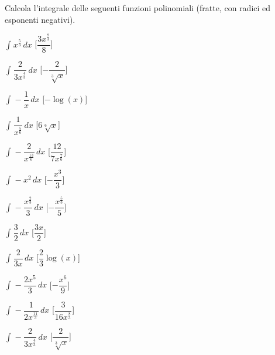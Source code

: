\begin{esercizio}\label{ese: 2}
Calcola l'integrale delle seguenti funzioni polinomiali                  
       (fratte, con radici ed esponenti negativi).
\begin{multicols}{2}
 \begin{enumeratea}
\item \(\int_{}^{}x^{\frac{5}{3}}\, dx\) 
 \hfill [\(\dfrac{3 x^{\frac{8}{3}}}{8}\)]
\item \(\int_{}^{}\dfrac{2}{3 x^{\frac{4}{3}}}\, dx\) 
 \hfill [\(- \dfrac{2}{\sqrt[3]{x}}\)]
\item \(\int_{}^{}- \dfrac{1}{x}\, dx\) 
 \hfill [\(- \log{\left (x \right )}\)]
\item \(\int_{}^{}\dfrac{1}{x^{\frac{5}{6}}}\, dx\) 
 \hfill [\(6 \sqrt[6]{x}\)]
\item \(\int_{}^{}- \dfrac{2}{x^{\frac{13}{6}}}\, dx\) 
 \hfill [\(\dfrac{12}{7 x^{\frac{7}{6}}}\)]
\item \(\int_{}^{}- x^{2}\, dx\) 
 \hfill [\(- \dfrac{x^{3}}{3}\)]
\item \(\int_{}^{}- \dfrac{x^{\frac{2}{3}}}{3}\, dx\) 
 \hfill [\(- \dfrac{x^{\frac{5}{3}}}{5}\)]
\item \(\int_{}^{}\dfrac{3}{2}\, dx\) 
 \hfill [\(\dfrac{3 x}{2}\)]
\item \(\int_{}^{}\dfrac{2}{3 x}\, dx\) 
 \hfill [\(\dfrac{2}{3} \log{\left (x \right )}\)]
\item \(\int_{}^{}- \dfrac{2 x^{5}}{3}\, dx\) 
 \hfill [\(- \dfrac{x^{6}}{9}\)]
\item \(\int_{}^{}- \dfrac{1}{2 x^{\frac{11}{3}}}\, dx\) 
 \hfill [\(\dfrac{3}{16 x^{\frac{8}{3}}}\)]
\item \(\int_{}^{}- \dfrac{2}{3 x^{\frac{4}{3}}}\, dx\) 
 \hfill [\(\dfrac{2}{\sqrt[3]{x}}\)]
 \end{enumeratea}
\end{multicols}
\end{esercizio}

